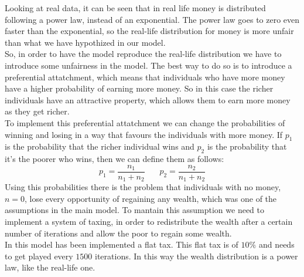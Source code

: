 Looking at real data, it can be seen that in real life money is distributed following a power law, instead of an exponential. The power law goes to zero even faster than the exponential, so the real-life distribution for money is more unfair than what we have hypothized in our model. \\
So, in order to have the model reproduce the real-life distribution we have to introduce some unfairness in the model. The best way to do so is to introduce a preferential attatchment, which means that individuals who have more money have a higher probability of earning more money. So in this case the richer individuals have an attractive property, which allows them to earn more money as they get richer. \\
To implement this preferential attatchment we can change the probabilities of winning and losing in a way that favours the individuals with more money. If $p_1$ is the probability that the richer individual wins and $p_2$ is the probability that it's the poorer who wins, then we can define them as follows:
\begin{equation}
	p_1 = \frac{n_1}{n_1+n_2} \ \ \ \ \ \ \ \  p_2 = \frac{n_2}{n_1+n_2}
\end{equation}
Using this probabilities there is the problem that individuals with no money, $n = 0$, lose every opportunity of regaining any wealth, which was one of the assumptions in the main model. To mantain this assumption we need to implement a system of taxing, in order to redistribute the wealth after a certain number of iterations and allow the poor to regain some wealth. \\
In this model has been implemented a flat tax. This flat tax is of $10\%$ and needs to get played every $1500$ iterations. In this way the wealth distribution is a power law, like the real-life one.
